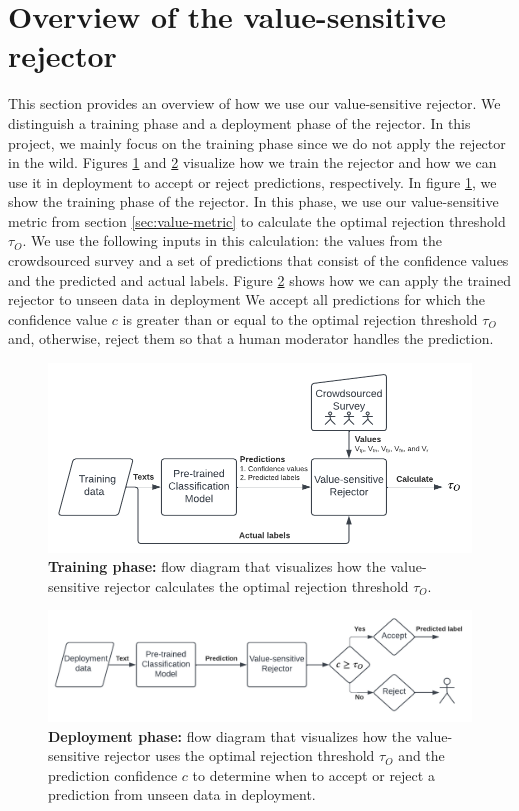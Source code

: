 \section{Overview of the value-sensitive rejector}
\label{sec:overview-rejector}
This section provides an overview of how we use our value-sensitive rejector.
%
We distinguish a training phase and a deployment phase of the rejector.
%
In this project, we mainly focus on the training phase since we do not apply the rejector in the wild.
%
Figures \ref{fig:training} and \ref{fig:deployment} visualize how we train the rejector and how we can use it in deployment to accept or reject predictions, respectively.
%
In figure \ref{fig:training}, we show the training phase of the rejector.
%
In this phase, we use our value-sensitive metric from section \ref{sec:value-metric} to calculate the optimal rejection threshold $\tau_O$.
%
We use the following inputs in this calculation: the values from the crowdsourced survey and a set of predictions that consist of the confidence values and the predicted and actual labels.
%
Figure \ref{fig:deployment} shows how we can apply the trained rejector to unseen data in deployment
%
We accept all predictions for which the confidence value $c$ is greater than or equal to the optimal rejection threshold $\tau_O$ and, otherwise, reject them so that a human moderator handles the prediction.
%
\begin{figure}
    \centering
    \includegraphics[scale=.75]{Figures/training.pdf}
    \caption{\textbf{Training phase:} flow diagram that visualizes how the value-sensitive rejector calculates the optimal rejection threshold $\tau_O$.}
    \label{fig:training}
\end{figure}
%
\begin{figure}
    \centering
    \includegraphics[scale=.75]{Figures/deployment.pdf}
    \caption{\textbf{Deployment phase:} flow diagram that visualizes how the value-sensitive rejector uses the optimal rejection threshold $\tau_O$ and the prediction confidence $c$ to determine when to accept or reject a prediction from unseen data in deployment.}
    \label{fig:deployment}
\end{figure}

